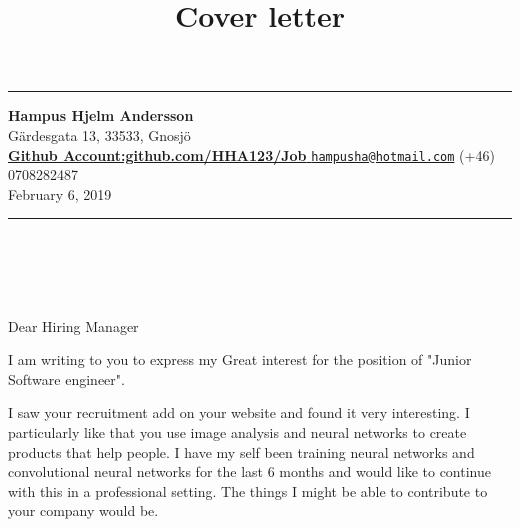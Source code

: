 \documentclass[]{article}
\title{Cover letter\vspace{1cm}} %
\author{}
\date{}
\begin{document}



\maketitle

\begin{center}\rule{0.99\linewidth}{\linethickness}\end{center}
\textbf{Hampus Hjelm Andersson}\\
Gärdesgata 13, 33533, Gnosjö\\
\href{https://github.com/HHA123/Job/}{\textbf{Github Account:github.com/HHA123/Job}
}
\textbar{}\textbar{}
\href{mailto:hampusha@hotmail.com}{\nolinkurl{hampusha@hotmail.com}}
\textbar{}\textbar{} (+46) 0708282487 \\
February 6, 2019
\vspace{1mm}
\begin{center}\rule{0.99\linewidth}{\linethickness}\end{center}
\hypertarget{section}{%
\section{\texorpdfstring{\\
}{ }}\label{section}}

Dear Hiring Manager

I am writing to you to express my Great interest for the position of
"Junior Software engineer".

I saw your recruitment add on your website and found it very interesting.
I particularly like that you use image analysis and neural networks
 to create products that  help people.
 I have my self been training neural networks and convolutional neural networks for
 the last 6 months and would like to continue with
 this in a professional setting.
The things I might be able to contribute to your company would be.




\end{document}
